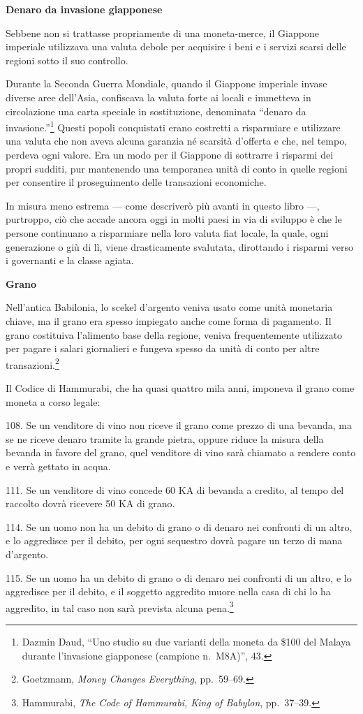 \documentclass[
  a5paper,
  smalldemyvopaper,10pt,twoside,onecolumn,openright,extrafontsizes,hidelinks]{memoir}
\renewenvironment{quote}%
               {\list{}{\rightmargin=.6cm\leftmargin=.6cm}%
                \itshape \item[]}%
               {\endlist}
\begin{document}
\textbf{Denaro da invasione giapponese}

Sebbene non si trattasse propriamente di una moneta-merce, il Giappone
imperiale utilizzava una valuta debole per acquisire i beni e i servizi
scarsi delle regioni sotto il suo controllo.

Durante la Seconda Guerra Mondiale, quando il Giappone imperiale invase
diverse aree dell'Asia, confiscava la valuta forte ai locali e immetteva
in circolazione una carta speciale in sostituzione, denominata ``denaro
da invasione.''\footnote{Dazmin Daud, ``Uno studio su due varianti della
  moneta da \$100 del Malaya durante l'invasione giapponese (campione
  n.~M8A)'', 43.} Questi popoli conquistati erano costretti a
risparmiare e utilizzare una valuta che non aveva alcuna garanzia né
scarsità d'offerta e che, nel tempo, perdeva ogni valore. Era un modo
per il Giappone di sottrarre i risparmi dei propri sudditi, pur
mantenendo una temporanea unità di conto in quelle regioni per
consentire il proseguimento delle transazioni economiche.

In misura meno estrema --- come descriverò più avanti in questo libro
---, purtroppo, ciò che accade ancora oggi in molti paesi in via di
sviluppo è che le persone continuano a risparmiare nella loro valuta
fiat locale, la quale, ogni generazione o giù di lì, viene drasticamente
svalutata, dirottando i risparmi verso i governanti e la classe agiata.

\textbf{Grano}

Nell'antica Babilonia, lo scekel d'argento veniva usato come unità
monetaria chiave, ma il grano era spesso impiegato anche come forma di
pagamento. Il grano costituiva l'alimento base della regione, veniva
frequentemente utilizzato per pagare i salari giornalieri e fungeva
spesso da unità di conto per altre transazioni.\footnote{Goetzmann,
  \emph{Money Changes Everything}, pp.~59--69.}

Il Codice di Hammurabi, che ha quasi quattro mila anni, imponeva il
grano come moneta a corso legale:

\begin{quote}
108. Se un venditore di vino non riceve il grano come prezzo di una
bevanda, ma se ne riceve denaro tramite la grande pietra, oppure riduce
la misura della bevanda in favore del grano, quel venditore di vino sarà
chiamato a rendere conto e verrà gettato in acqua.

111. Se un venditore di vino concede 60 KA di bevanda a credito, al
tempo del raccolto dovrà ricevere 50 KA di grano.

114. Se un uomo non ha un debito di grano o di denaro nei confronti di
un altro, e lo aggredisce per il debito, per ogni sequestro dovrà pagare
un terzo di mana d'argento.

115. Se un uomo ha un debito di grano o di denaro nei confronti di un
altro, e lo aggredisce per il debito, e il soggetto aggredito muore
nella casa di chi lo ha aggredito, in tal caso non sarà prevista alcuna
pena.\footnote{Hammurabi, \emph{The Code of Hammurabi, King of Babylon},
  pp.~37--39.}
\end{quote}
\end{document}
